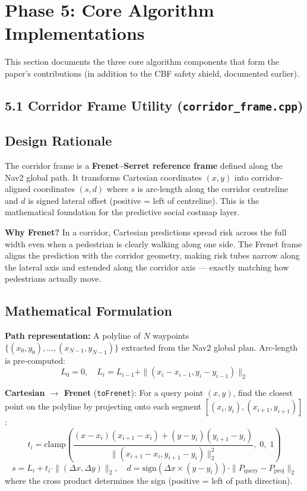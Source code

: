 \documentclass[11pt]{article}
\newcommand{\logentry}[1]{\subsection*{#1}}
\begin{document}
\section{Phase 5: Core Algorithm Implementations}

This section documents the three core algorithm components that form the paper's
contributions (in addition to the CBF safety shield, documented earlier).

\subsection*{5.1 Corridor Frame Utility (\texttt{corridor\_frame.cpp})}

\logentry{Design Rationale}
The corridor frame is a \textbf{Frenet--Serret reference frame} defined along
the Nav2 global path. It transforms Cartesian coordinates $(x, y)$ into
corridor-aligned coordinates $(s, d)$ where $s$ is arc-length along the corridor
centreline and $d$ is signed lateral offset (positive = left of centreline).
This is the mathematical foundation for the predictive social costmap layer.

\textbf{Why Frenet?} In a corridor, Cartesian predictions spread risk across the
full width even when a pedestrian is clearly walking along one side. The Frenet
frame aligns the prediction with the corridor geometry, making risk tubes narrow
along the lateral axis and extended along the corridor axis --- exactly matching
how pedestrians actually move.

\logentry{Mathematical Formulation}

\textbf{Path representation:} A polyline of $N$ waypoints
$\{(x_0,y_0), \ldots, (x_{N-1},y_{N-1})\}$ extracted from the Nav2 global plan.
Arc-length is pre-computed:
\[
  L_0 = 0, \quad L_i = L_{i-1} + \|(x_i - x_{i-1}, y_i - y_{i-1})\|_2
\]

\textbf{Cartesian $\to$ Frenet} (\texttt{toFrenet}):
For a query point $(x, y)$, find the closest point on the polyline by projecting
onto each segment $[(x_i, y_i), (x_{i+1}, y_{i+1})]$:
\[
  t_i = \mathrm{clamp}\left(
    \frac{(x - x_i)(x_{i+1} - x_i) + (y - y_i)(y_{i+1} - y_i)}
         {\|(x_{i+1} - x_i, y_{i+1} - y_i)\|_2^2},\; 0,\; 1
  \right)
\]
\[
  s = L_i + t_i \cdot \|(\Delta x, \Delta y)\|_2, \quad
  d = \mathrm{sign}(\Delta x \times (y - y_i)) \cdot \|P_\mathrm{query} - P_\mathrm{proj}\|_2
\]
where the cross product determines the sign (positive = left of path direction).
\end{document}
